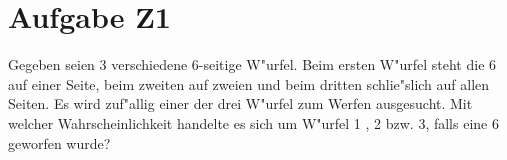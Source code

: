 \section{Aufgabe Z1}
Gegeben seien 3 verschiedene 6-seitige W"urfel. Beim ersten W"urfel steht die 6 auf einer Seite, beim zweiten auf zweien und beim dritten schlie"slich auf allen Seiten. Es wird zuf"allig einer der drei W"urfel zum Werfen ausgesucht.
Mit welcher Wahrscheinlichkeit handelte es sich um W"urfel 1 , 2 bzw. 3, falls eine 6 geworfen wurde?